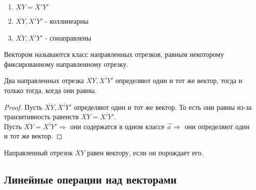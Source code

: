 \begin{enumerate}
	\item \(XY = X'Y'\)
	\item \(\overline{XY}, \overline{X'Y'}\) - коллинеарны
	\item \(\overline{XY}, \overline{X'Y'}\) - сонаправлены
\end{enumerate}

\begin{definition}
	Вектором называются класс направленных отрезков, равным некоторому фиксированному направленному отрезку.
\end{definition}
\begin{proposition}
	Два направленных отрезка \(\overline{XY}, \overline{X'Y'}\) определяют один и тот же вектор, тогда и только тогда, когда они равны.
\end{proposition}
\begin{proof}
	Пусть \(\overline{XY}, \overline{X'Y'}\) определяют один и тот же вектор. То есть они равны из-за транзитивность равенств \(\overline{XY} = \overline{X'Y'}\). \\
	Пусть \(\overline{XY} = \overline{X'Y'} \Longrightarrow \) они содержатся в одном классе \(\vec{a} \Longrightarrow \) они определяют один и тот же вектор. 
\end{proof}
\begin{definition}
	Направленный отрезок $XY$ равен вектору, если он порождает его.
\end{definition}
\subsection{Линейные операции над векторами}

